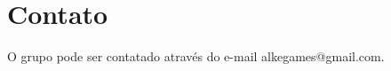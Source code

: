 \AddToShipoutPicture{\BackgroundPic}

\section*{Contato}
O grupo pode ser contatado através do e-mail alkegames@gmail.com.
